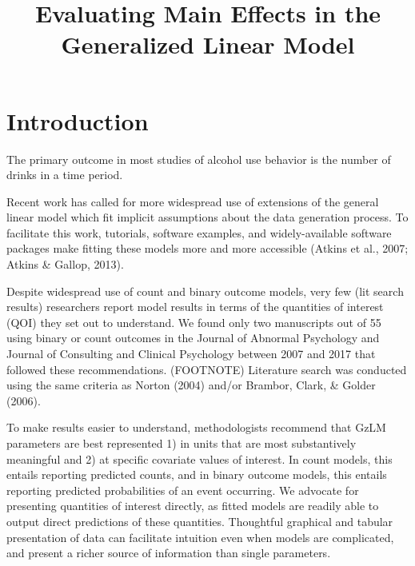 \documentclass[jou, apacite]{apa6}
\begin{document}
\title{Evaluating Main Effects in the Generalized Linear Model}


\abstract{}



\maketitle

\section{Introduction}
The primary outcome in most studies of alcohol use behavior is the number of drinks in a time period. 

Recent work has called for more widespread use of extensions of the general linear model which fit implicit assumptions about the data generation process. To facilitate this work, tutorials, software examples, and widely-available software packages make fitting these models more and more accessible (Atkins et al., 2007; Atkins \& Gallop, 2013).

Despite widespread use of count and binary outcome models, very few (lit search results) researchers report model results in terms of the quantities of interest (QOI) they set out to understand. We found only two manuscripts out of 55 using binary or count outcomes in the Journal of Abnormal Psychology and Journal of Consulting and Clinical Psychology between 2007 and 2017 that followed these recommendations. (FOOTNOTE) Literature search was conducted using the same criteria as Norton (2004) and/or Brambor, Clark, \& Golder (2006). 

To make results easier to understand, methodologists recommend that GzLM parameters are best represented 1) in units that are most substantively meaningful and 2) at specific covariate values of interest. In count models, this entails reporting predicted counts, and in binary outcome models, this entails reporting predicted probabilities of an event occurring. We advocate for presenting quantities of interest directly, as fitted models are readily able to output direct predictions of these quantities. Thoughtful graphical and tabular presentation of data can facilitate intuition even when models are complicated, and present a richer source of information than single parameters. 
\end{document}
